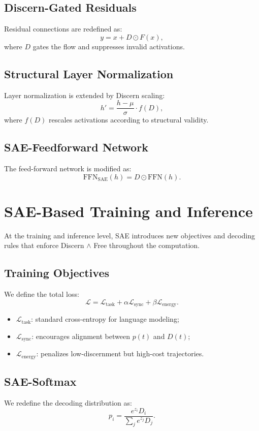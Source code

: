 \documentclass[11pt]{article}
\theoremstyle{plain}
\theoremstyle{definition}
\theoremstyle{remark}
\begin{document}
\subsection{Discern-Gated Residuals}
Residual connections are redefined as:
\[
y = x + D \odot F(x),
\]
where $D$ gates the flow and suppresses invalid activations.

\subsection{Structural Layer Normalization}
Layer normalization is extended by Discern scaling:
\[
h' = \frac{h - \mu}{\sigma} \cdot f(D),
\]
where $f(D)$ rescales activations according to structural validity.

\subsection{SAE-Feedforward Network}
The feed-forward network is modified as:
\[
\text{FFN}_{\text{SAE}}(h) = D \odot \text{FFN}(h).
\]

\section{SAE-Based Training and Inference}

At the training and inference level, SAE introduces new objectives and decoding rules that enforce Discern $\wedge$ Free throughout the computation.  

\subsection{Training Objectives}
We define the total loss:
\[
\mathcal{L} = \mathcal{L}_{\text{task}} + \alpha \mathcal{L}_{\text{sync}} + \beta \mathcal{L}_{\text{energy}}.
\]

\begin{itemize}
  \item $\mathcal{L}_{\text{task}}$: standard cross-entropy for language modeling;
  \item $\mathcal{L}_{\text{sync}}$: encourages alignment between $p(t)$ and $D(t)$;
  \item $\mathcal{L}_{\text{energy}}$: penalizes low-discernment but high-cost trajectories.
\end{itemize}

\subsection{SAE-Softmax}
We redefine the decoding distribution as:
\[
p_i = \frac{e^{z_i} D_i}{\sum_j e^{z_j} D_j}.
\]
\end{document}
